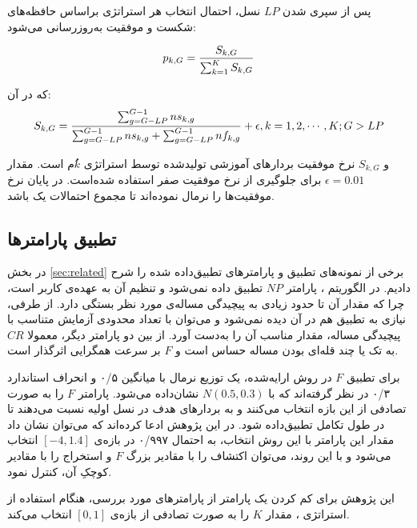 \documentclass[12pt,a4paper]{article}
\theoremstyle{definition}
\theoremstyle{theorem}
\theoremstyle{definition}
\begin{document}
پس از سپری شدن 
$\mathit{LP}$ 
نسل، احتمال انتخاب هر استراتژی براساس حافظه‌های شکست و موفقیت به‌روزرسانی می‌شود:

\begin{equation}
p_{k,G} = {{S_{k,G}} \over {\sum_{k=1}^{K} {S_{k,G}}}}
\end{equation}

که در آن:
\begin{equation}
S_{k,G} = { {\sum^{G-1}_{g=G-LP} ns_{k,g}} \over {{\sum^{G-1}_{g=G-LP} ns_{k,g}} + {\sum^{G-1}_{g=G-LP} nf_{k,g}} } } + \epsilon , k= 1, 2 , \cdots , K ; G>LP
\end{equation}

و 
$S_{k,G}$
نرخ موفقیت بردارهای آموزشی تولیدشده توسط استراتژی 
$k$ُم
است. مقدار 
$\epsilon = 0.01$
برای جلوگیری از نرخ موفقیت صفر استفاده شده‌است. در پایان نرخ موفقیت‌ها را نرمال نموده‌اند تا مجموع احتمالات یک باشد. 

\newpage
\subsection{تطبیق پارامترها}

در بخش \ref{sec:related} برخی از نمونه‌های تطبیق و پارامترهای تطبیق‌داده‌ شده را شرح دادیم. در الگوریتم 
، پارامتر 
$\mathit{NP}$
تطبیق‌‌ داده نمی‌شود و تنظیم آن به عهده‌ی کاربر است، چرا که مقدار آن تا حدود زیادی به پیچیدگی مساله‌ی مورد نظر بستگی دارد. از طرفی، نیازی به تطبیق هم در آن دیده نمی‌شود و می‌توان با تعداد محدودی آزمایش متناسب با پیچیدگی مساله، مقدار مناسب آن را به‌دست آورد. از بین دو پارامتر دیگر، معمولا 
$\mathit{CR}$
به تک یا چند قله‌ای بودن مساله حساس است و 
$\mathit{F}$
بر سرعت همگرایی اثرگذار است. 

برای تطبیق
$\mathit{F}$
در روش ارایه‌شده، یک توزیع نرمال با میانگین ۰/۵ و انحراف استاندارد ۰/۳ در نظر گرفته‌اند که با 
$N(0.5,0.3)$
نشان‌داده می‌شود. پارامتر
$\mathit{F}$
را به صورت تصادفی از این بازه انتخاب می‌کنند و به بردارهای هدف در نسل اولیه نسبت می‌دهند تا در طول تکامل تطبیق‌داده شود. در این پژوهش ادعا کرده‌اند که می‌توان نشان داد مقدار این پارامتر با این روش انتخاب، به احتمال ۰/۹۹۷ در بازه‌ی 
$[-4, 1.4]$
انتخاب می‌شود و با این روند، می‌توان اکتشاف را با مقادیر بزرگ
$\mathit{F}$
و استخراج را با مقادیر کوچکِ آن، کنترل نمود. 

این پژوهش برای کم کردن یک پارامتر از پارامترهای مورد بررسی، هنگام استفاده از استراتژی 
، 
مقدار 
$\mathit{K}$
را به صورت تصادفی از بازه‌ی 
$[0,1]$
انتخاب می‌کند. 
\end{document}
